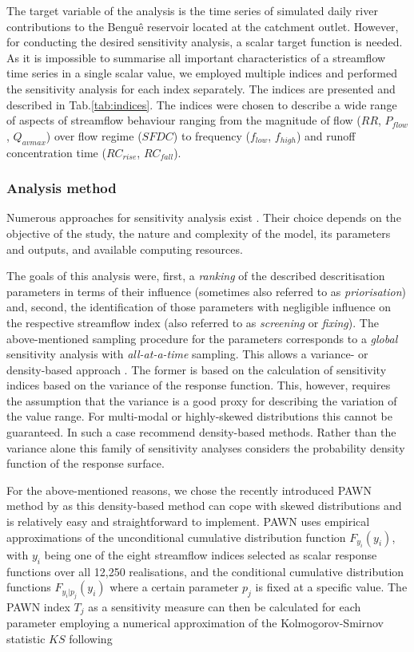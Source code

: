 The target variable of the analysis is the time series of simulated daily river contributions to the Bengu\^e reservoir located at the catchment outlet.
However, for conducting the desired sensitivity analysis, a scalar target function is needed.
As it is impossible to summarise all important characteristics of a streamflow time series in a single scalar value, we employed multiple indices and performed the sensitivity analysis for each index separately.
The indices are presented and described in Tab.\DIFaddbegin \DIFadd{\ }\DIFaddend \ref{tab:indices}.
The indices were chosen to describe a wide range of aspects of streamflow behaviour ranging from the magnitude of flow ($RR$, $P_{flow}$, $Q_{avmax}$) over flow regime ($SFDC$) to frequency ($f_{low}$, $f_{high}$) and runoff concentration time ($RC_{rise}$, $RC_{fall}$).

\subsubsection{Analysis method}

Numerous approaches for sensitivity analysis exist \citep{Pianosi2016a}.
Their choice depends on the objective of the study, the nature and complexity of the model, its parameters and outputs, and available computing resources.

The goals of this analysis were, first, a \emph{ranking} of the described descritisation parameters in terms of their influence (sometimes also referred to as \emph{priorisation}) and, second, the identification of those parameters with negligible influence on the respective streamflow index (also referred to as \emph{screening} or \emph{fixing}).
The above-mentioned sampling procedure for the parameters corresponds to a \emph{global} sensitivity analysis with \emph{all-at-a-time} sampling.
This allows a variance- or density-based approach \citet{Pianosi2016a}.
The former is based on the calculation of sensitivity indices based on the variance of the response function.
This, however, requires the assumption that the variance is a good proxy for describing the variation of the value range.
For multi-modal or highly-skewed distributions this cannot be guaranteed.
In such a case \citet{Pianosi2016a} recommend density-based methods.
Rather than the variance alone this family of sensitivity analyses considers the probability density function of the response surface.


For the above-mentioned reasons, we chose the recently introduced PAWN method by \citet{Pianosi2015} as this density-based method can cope with skewed distributions and is relatively easy and straightforward to implement.
PAWN uses empirical approximations of the unconditional cumulative distribution function $F_{y_i}(y_i)$, with $y_i$ being one of the eight streamflow indices selected as scalar response functions over all 12,250 realisations, and the conditional cumulative distribution functions $F_{y_i|p_j}(y_i)$ where a certain parameter $p_j$ is fixed at a specific value.
The PAWN index $T_j$ as a sensitivity measure can then be calculated for each parameter employing a numerical approximation of the Kolmogorov-Smirnov statistic $KS$ following

